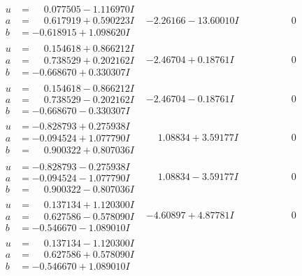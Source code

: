 \documentclass[1p]{elsarticle_modified}
\theoremstyle{definition}
\begin{document}
$$\begin{array}{c|c|c}
\begin{aligned}
u &= \phantom{-}0.077505 - 1.116970 I \\
a &= \phantom{-}0.617919 + 0.590223 I \\
b &= -0.618915 + 1.098620 I\end{aligned}
 & -2.26166 - 13.60010 I & \phantom{-0.000000 } 0 \\ \hline\begin{aligned}
u &= \phantom{-}0.154618 + 0.866212 I \\
a &= \phantom{-}0.738529 + 0.202162 I \\
b &= -0.668670 + 0.330307 I\end{aligned}
 & -2.46704 + 0.18761 I & \phantom{-0.000000 } 0 \\ \hline\begin{aligned}
u &= \phantom{-}0.154618 - 0.866212 I \\
a &= \phantom{-}0.738529 - 0.202162 I \\
b &= -0.668670 - 0.330307 I\end{aligned}
 & -2.46704 - 0.18761 I & \phantom{-0.000000 } 0 \\ \hline\begin{aligned}
u &= -0.828793 + 0.275938 I \\
a &= -0.094524 + 1.077790 I \\
b &= \phantom{-}0.900322 + 0.807036 I\end{aligned}
 & \phantom{-}1.08834 + 3.59177 I & \phantom{-0.000000 } 0 \\ \hline\begin{aligned}
u &= -0.828793 - 0.275938 I \\
a &= -0.094524 - 1.077790 I \\
b &= \phantom{-}0.900322 - 0.807036 I\end{aligned}
 & \phantom{-}1.08834 - 3.59177 I & \phantom{-0.000000 } 0 \\ \hline\begin{aligned}
u &= \phantom{-}0.137134 + 1.120300 I \\
a &= \phantom{-}0.627586 - 0.578090 I \\
b &= -0.546670 - 1.089010 I\end{aligned}
 & -4.60897 + 4.87781 I & \phantom{-0.000000 } 0 \\ \hline\begin{aligned}
u &= \phantom{-}0.137134 - 1.120300 I \\
a &= \phantom{-}0.627586 + 0.578090 I \\
b &= -0.546670 + 1.089010 I\end{aligned}

\end{array}$$
\end{document}
